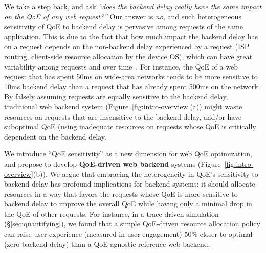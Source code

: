 We take a step back, and ask {\em ``does the backend delay really have the same impact on the QoE of any web request?''}
Our answer is {\em no}, and such heterogeneous sensitivity of QoE to backend delay is pervasive among requests of the same application. 
This is due to the fact that how much impact the backend delay has on a request depends on the non-backend delay experienced by a request (\eg ISP routing, client-side resource allocation by the device OS), which can have great variability among requests and over time~\cite{timecard,dqbarge}.
For instance, the QoE of a web request that has spent 50ms on wide-area networks tends to be more sensitive to 10ms backend delay than a request that has already spent 500ms on the network.
By falsely assuming requests are equally sensitive to the backend delay, traditional web backend system (Figure~\ref{fig:intro-overview}(a)) might waste resources on requests that are insensitive to the backend delay, and/or have suboptimal QoE (\eg using inadequate resources on requests whose QoE is critically dependent on the backend delay. 

We introduce ``QoE sensitivity'' as a new dimension for web QoE optimization, and propose to develop {\bf QoE-driven web backend} systems (Figure~\ref{fig:intro-overview}(b)). 
We argue that embracing the heterogeneity in QoE's sensitivity to backend delay has profound implications for backend systems: 
it should allocate resources in a way that favors the requests whose QoE is more sensitive to backend delay to improve the overall QoE while having only a minimal drop in the QoE of other requests.
For instance, in a trace-driven simulation (\S\ref{sec:quantifying}), we found that a simple QoE-driven resource allocation policy can raise user experience (measured in user engagement) 50\% closer to optimal (\ie zero backend delay) than a QoE-agnostic reference web backend.

